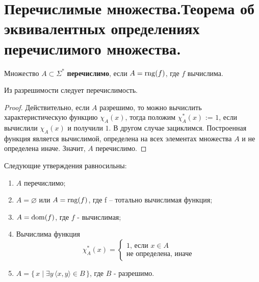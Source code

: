 \section{Перечислимые множества.Теорема об эквивалентных определениях перечислимого множества.}
\begin{definition}
	Множество $A \subset \Sigma^*$ \textbf{перечислимо}, если $A=\operatorname{rng}(f)$, где $f$ вычислима.
\end{definition}

\begin{proposition}
	Из разрешимости следует перечислимость.
\end{proposition}
\begin{proof}
	Действительно, если $A$ разрешимо, то можно вычислить характеристическую функцию $\chi_{A}(x)$, тогда положим
	$\chi^*_{A}(x)$ := $1$, если вычислили  $\chi_{A}(x)$ и получили $1$. В другом случае зациклимся. Построенная
	функция является вычислимой, определена на всех элементах множества $A$ и не определена иначе. Значит, $A$
	перечислимо.
\end{proof}
\begin{theorem}
	Следующие утверждения равносильны:
	\begin{enumerate}
		\item $A$ перечислимо;
		\item $A = \varnothing $ или $A=\operatorname{rng}(f)$, где f -- тотально вычислимая функция;
		\item $A = \operatorname{dom}(f)$, где $f$ - вычислимая;
		\item Вычислима функция
			\begin{equation*}
				\chi^*_{A}(x) = 
				\begin{cases}
					\text{1, если $x \in A$}\\
					\text{не определена, иначе}
				\end{cases}
			\end{equation*}
		\item $A = \{\,x\mid\exists y\,\langle x,y\rangle\in B\,\}$, где $B$ - разрешимо.
	\end{enumerate}
\end{theorem}
